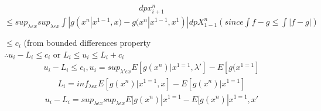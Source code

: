 \documentclass[journal,12pt,twocolumn]{IEEEtran}
\renewcommand\thesection{\arabic{section}}
\begin{document}
\begin{enumerate}[label=\thesection.\arabic*,ref=\thesection.\theenumi]
\begin{align}
d px_{i+1}^n
\end{align}
$\leqslant sup_{\lambda \varepsilon x} sup_{\lambda \varepsilon x} \int|g(x^n|x^{1-1} ,x)-g(x^n|x^{1-1},x^1)|dp X^{n}_{1-1}(since \int f-g\leqslant \int |f-g|)$

$\leqslant c_i$ (from bounded  differences property\\

$\therefore u_i-L_i\leqslant c_i $ or $L_i\leqslant u_i\leqslant L_i+c_i$
\begin{align}
u_i-L_i \leqslant c_i, u_i=sup_{\lambda' \epsilon x}{E[g(x^n)|x^{1=1},\lambda']-E[g(x^{1=1}]}
\end{align}
\begin{align}
L_i=inf_{\lambda \epsilon x}{E[g(x^n)|x^{1=1},x]-E[g(x^n)|x^{1=1}]}
\end{align}
\begin{align}
u_i-L_i=sup_{\lambda \epsilon x} sup_{\lambda \epsilon x}{E[g(x^n)|x^{1=1}-E[g(x^n)|x^{1=1},x'}
\end{align}


\end{enumerate}
\end{document}
